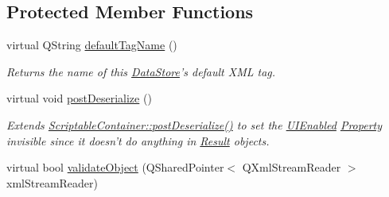 \subsection*{Protected Member Functions}
\begin{DoxyCompactItemize}
\item 
virtual Q\-String \hyperlink{class_picto_1_1_result_a559d83849d9112ea474ea8b8bbfa9a8e}{default\-Tag\-Name} ()
\begin{DoxyCompactList}\small\item\em Returns the name of this \hyperlink{class_picto_1_1_data_store}{Data\-Store}'s default X\-M\-L tag. \end{DoxyCompactList}\item 
\hypertarget{class_picto_1_1_result_a180af9876c9579eda252a1c4b8f440c2}{virtual void \hyperlink{class_picto_1_1_result_a180af9876c9579eda252a1c4b8f440c2}{post\-Deserialize} ()}\label{class_picto_1_1_result_a180af9876c9579eda252a1c4b8f440c2}

\begin{DoxyCompactList}\small\item\em Extends \hyperlink{class_picto_1_1_scriptable_container_a0654af2c08f9a6c967a21b57614950ba}{Scriptable\-Container\-::post\-Deserialize()} to set the \hyperlink{class_picto_1_1_u_i_enabled}{U\-I\-Enabled} \hyperlink{class_picto_1_1_property}{Property} invisible since it doesn't do anything in \hyperlink{class_picto_1_1_result}{Result} objects. \end{DoxyCompactList}\item 
\hypertarget{class_picto_1_1_result_add19b99738db3cf72ca051d57fbeaf9b}{virtual bool \hyperlink{class_picto_1_1_result_add19b99738db3cf72ca051d57fbeaf9b}{validate\-Object} (Q\-Shared\-Pointer$<$ Q\-Xml\-Stream\-Reader $>$ xml\-Stream\-Reader)}\label{class_picto_1_1_result_add19b99738db3cf72ca051d57fbeaf9b}


\end{DoxyCompactItemize}
